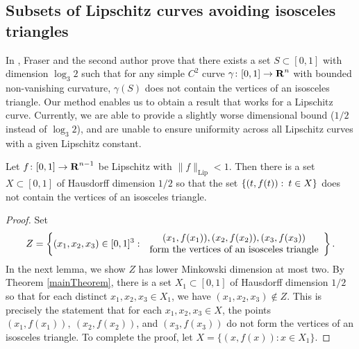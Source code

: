 \subsection{Subsets of Lipschitz curves avoiding isosceles triangles}

In \cite{MalabikaRob}, Fraser and the second author prove that there exists a set $S \subset [0,1]$ with dimension $\log_3 2$ such that for any simple $C^2$ curve $\gamma \colon [0,1] \to \operatorname{\mathbf{R}}^n$ with bounded non-vanishing curvature, $\gamma(S)$ does not contain the vertices of an isosceles triangle. Our method enables us to obtain a result that works for a Lipschitz curve. Currently, we are able to provide a slightly worse dimensional bound ($1/2$ instead of $\log_3 2$), and are unable to ensure uniformity across all Lipschitz curves with a given Lipschitz constant.

\begin{theorem}\label{C1IsoscelesThm}
	Let $f\colon [0,1] \to \operatorname{\mathbf{R}}^{n-1}$ be Lipschitz with $\| f \|_{\text{Lip}} < 1$. Then there is a set $X \subset [0,1]$ of Hausdorff dimension $1/2$ so that the set $\{(t,f(t)) \operatorname{\colon} t\in X\}$ does not contain the vertices of an isosceles triangle.
\end{theorem}
\begin{proof}
	Set
	\[ Z = \left\{ (x_1,x_2,x_3) \in [0,1]^3\operatorname{\colon} \begin{array}{c} (x_1,f(x_1)), (x_2,f(x_2)), (x_3,f(x_3))\\
		\textrm{form the vertices of an isosceles triangle} \end{array} \right\}. \]
	In the next lemma, we show $Z$ has lower Minkowski dimension at most two. By Theorem \ref{mainTheorem}, there is a set $X_1\subset[0,1]$ of Hausdorff dimension $1/2$ so that for each distinct $x_1,x_2,x_3\in X_1$, we have $(x_1,x_2,x_3)\not\in Z$. This is precisely the statement that for each $x_1,x_2,x_3\in X$, the points $(x_1,f(x_1)),\ (x_2,f(x_2))$, and $(x_3,f(x_3))$ do not form the vertices of an isosceles triangle. To complete the proof, let $X = \{ (x,f(x)) : x \in X_1 \}$.
\end{proof}

